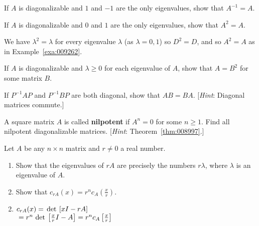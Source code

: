 \begin{multicols}{2}
\begin{ex}
If $A$ is diagonalizable and $1$ and $-1$ are the only eigenvalues, show that $A^{-1} = A$.
\end{ex}

\begin{ex}
If $A$ is diagonalizable and $0$ and $1$ are the only eigenvalues, show that $A^{2} = A$.

\begin{sol}
We have $\lambda^{2} = \lambda$ for every eigenvalue $\lambda$ (as $\lambda = 0, 1$) so $D^{2} = D$, and so $A^{2} = A$ as in Example~\ref{exa:009262}.
\end{sol}
\end{ex}

\begin{ex}
If $A$ is diagonalizable and $\lambda \geq 0$ for each eigenvalue of $A$, show that $A = B^{2}$ for some matrix $B$.
\end{ex}

\begin{ex}
If $P^{-1}AP$ and $P^{-1}BP$ are both diagonal, show that $AB = BA$. [\textit{Hint}: Diagonal matrices commute.]
\end{ex}

\begin{ex}
A square matrix $A$ is called \textbf{nilpotent} if $A^{n} = 0$ for some $n \geq 1$. Find all nilpotent diagonalizable matrices. [\textit{Hint}: Theorem~\ref{thm:008997}.]
\end{ex}

\begin{ex}
Let $A$ be any $n \times n$ matrix and $r \neq 0$ a real number.


\begin{enumerate}[label={\alph*.}]
\item Show that the eigenvalues of $rA$ are precisely the numbers $r\lambda$, where $\lambda$ is an eigenvalue of $A$.

\item Show that $c_{rA}(x) = r^n c_A\left( \frac{x}{r} \right)$.


\end{enumerate}
\begin{sol}
\begin{enumerate}[label={\alph*.}]
\setcounter{enumi}{1}
\item  $c_{rA} (x) =\thinspace\operatorname{det\medspace} \left[ xI - rA \right]$ \\ ${} = r^n \thinspace\operatorname{det\medspace} \left[ \tfrac{x}{r}I-A \right] = r^n c_A \left[ \tfrac{x}{r} \right]$



\end{enumerate}
\end{sol}
\end{ex}
\end{multicols}
